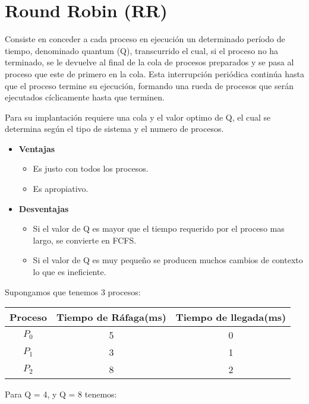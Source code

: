 \documentclass{article}
\begin{document}
{\centering \section{Round Robin (RR)}}

Consiste en conceder a cada proceso en ejecución un determinado período de tiempo, denominado quantum (Q), transcurrido el cual,
si el proceso no ha terminado, se le devuelve al final de la cola de procesos preparados y se pasa al proceso
que este de primero en la cola.
Esta interrupción periódica continúa hasta que el proceso termine su ejecución, formando una rueda de procesos que 
serán ejecutados cíclicamente hasta que terminen.

Para su implantación requiere una cola y el valor optimo de Q, el cual se determina según
el tipo de sistema y el numero de procesos.

\begin{itemize}
	\item \textbf{Ventajas}
	\begin{itemize}
		\item Es justo con todos los procesos.
		\item Es apropiativo.
	\end{itemize}
	
	\item \textbf{Desventajas}
	\begin{itemize}
		\item Si el valor de Q es mayor que el tiempo requerido 
		por el proceso mas largo, se convierte en FCFS.
		\item Si el valor de Q es muy pequeño se producen muchos
		cambios de contexto lo que es ineficiente.
	\end{itemize}
\end{itemize}

Supongamos que tenemos 3 procesos:
\begin{center}
	\begin{tabular}{c|c|c}
		Proceso & Tiempo de Ráfaga(ms) & Tiempo de llegada(ms) \\ \hline
		$P_{0}$ & 5 & 0 \\ \hline
		$P_{1}$ & 3 & 1 \\ \hline
		$P_{2}$ & 8 & 2 \\ \hline
	\end{tabular}
\end{center}

Para Q = 4,  y Q = 8 tenemos:
\end{document}
